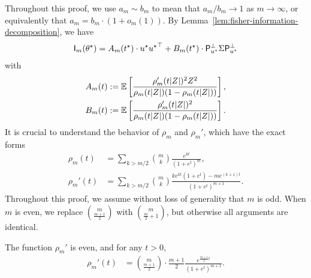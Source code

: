 Throughout this proof, we use $a_m \sim b_m$ to mean that
$a_m/b_m \to 1$ as $m \to \infty$, or equivalently that
$a_m = b_m \cdot(1 + o_m(1))$.
By Lemma~\ref{lem:fisher-information-decomposition},
we have 
\begin{align*} 
	\mathsf{I}_m(\theta^\star) = A_m (t^\star) \cdot u^\star {u^\star}^\top +   B_m (t^\star) \cdot \mathsf{P}_{u^\star}^\perp \Sigma \mathsf{P}_{u^\star}^\perp 
\end{align*}
with
\begin{subequations}
\begin{align}
	A_m(t) & := \mathbb{E} \left[{\frac{\rho_m'(t|Z|)^2 Z^2}{\rho_m(t|Z|) ( 1 - \rho_m(t|Z|))}}\right], \label{eq:fisher-information-Am} \\
	B_m(t)& := \mathbb{E} \left[{\frac{\rho_m'(t|Z|)^2 }{\rho_m(t|Z|) ( 1 - \rho_m(t|Z|))}}\right]. \label{eq:fisher-information-Bm}
\end{align}
\end{subequations}
It is crucial to understand the behavior of
$\rho_m$ and $\rho_m'$, which have the exact forms
\begin{align*}
  \rho_m(t) & %
  = \sum_{k>m/2}\binom{m}{k} \frac{e^{kt}}{(1+e^t)^m}, \\
  \rho_m'(t) & %
  = \sum_{k > m/2} \binom{m}{k} \frac{ke^{kt} (1+e^t) - me^{(k+1)t}}{(1+e^t)^{m+1}}.
\end{align*}
Throughout this proof, we assume without loss of generality that $m$ is
odd. When $m$ is even, we replace $\binom{m}{\frac{m+1}{2}}$ with
$\binom{m}{\frac{m}{2}+1}$, but otherwise all arguments are identical.
\begin{lemma} \label{lem:rho-m-prime-asymptotics}
	The function $\rho_m'$ is even, and for any $t > 0$,
	\begin{align*}
		\rho_m'(t) &= \binom{m}{\frac{m+1}{2}} \cdot \frac{m+1}{2} \frac{e^{\frac{m+1}{2}t}}{(1+e^t)^{m+1}}.
	\end{align*}
\end{lemma}
